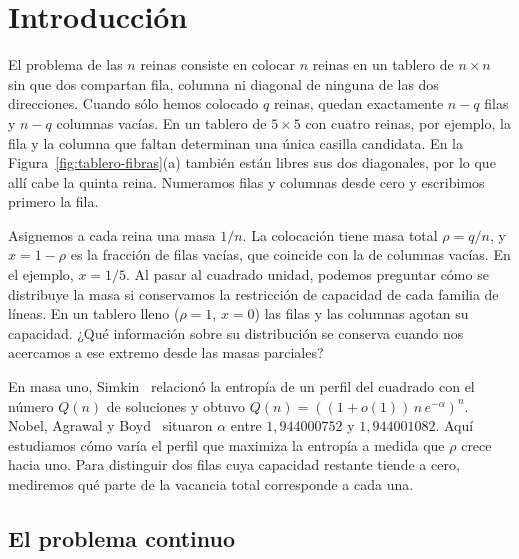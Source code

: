 \section{Introducción}\label{sec:intro}

El problema de las $n$ reinas consiste en colocar $n$ reinas en un tablero de $n\times n$
sin que dos compartan fila, columna ni diagonal de ninguna de las dos direcciones.
Cuando sólo hemos colocado $q$ reinas, quedan exactamente $n-q$ filas y $n-q$ columnas vacías.
En un tablero de $5\times5$ con cuatro reinas, por ejemplo, la fila y la columna que faltan
determinan una única casilla candidata. En la Figura~\ref{fig:tablero-fibras}(a)
también están libres sus dos diagonales, por lo que allí cabe la quinta reina.
Numeramos filas y columnas desde cero y escribimos primero la fila.



Asignemos a cada reina una masa $1/n$. La colocación tiene masa total $\rho=q/n$,
y $x=1-\rho$ es la fracción de filas vacías, que coincide con la de columnas vacías.
En el ejemplo, $x=1/5$. Al pasar al cuadrado unidad, podemos preguntar cómo se distribuye
la masa si conservamos la restricción de capacidad de cada familia de líneas.
En un tablero lleno ($\rho=1$, $x=0$) las filas y las columnas agotan su capacidad. ¿Qué información sobre
su distribución se conserva cuando nos acercamos a ese extremo desde las masas parciales?

En masa uno, Simkin~\cite{Simkin} relacionó la entropía de un perfil del cuadrado con
el número $Q(n)$ de soluciones y obtuvo $Q(n)=((1+o(1))\,n\,e^{-\alpha})^n$.
Nobel, Agrawal y Boyd~\cite{NAB} situaron $\alpha$ entre $1{,}944000752$ y $1{,}944001082$.
Aquí estudiamos cómo varía el perfil que maximiza la entropía a medida que $\rho$ crece hacia uno.
Para distinguir dos filas cuya capacidad restante tiende a cero, mediremos qué parte
de la vacancia total corresponde a cada una.

\subsection{El problema continuo}


